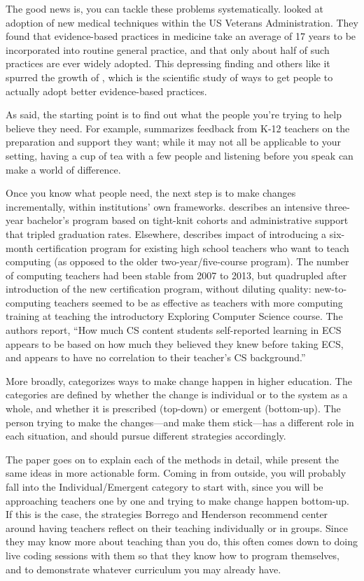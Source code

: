 The good news is, you can tackle these problems systematically.
\cite{Baue2015} looked at adoption of new medical techniques within
the US Veterans Administration.  They found that evidence-based
practices in medicine take an average of 17 years to be incorporated
into routine general practice, and that only about half of such
practices are ever widely adopted.  This depressing finding and others
like it spurred the growth of
, which is
the scientific study of ways to get people to actually adopt better
evidence-based practices.

As  said, the starting point is to find out what
the people you're trying to help believe they need.  For example,
\cite{Yada2016} summarizes feedback from K-12 teachers on the
preparation and support they want; while it may not all be applicable
to your setting, having a cup of tea with a few people and listening
before you speak can make a world of difference.

Once you know what people need, the next step is to make changes
incrementally, within institutions' own frameworks.  \cite{Nara2018}
describes an intensive three-year bachelor's program based on
tight-knit cohorts and administrative support that tripled graduation
rates.  Elsewhere, \cite{Hu2017} describes impact of introducing a
six-month certification program for existing high school teachers who
want to teach computing (as opposed to the older two-year/five-course
program).  The number of computing teachers had been stable from 2007
to 2013, but quadrupled after introduction of the new certification
program, without diluting quality: new-to-computing teachers seemed to
be as effective as teachers with more computing training at teaching
the introductory Exploring Computer Science course.  The authors
report, ``How much CS content students self-reported learning in ECS
appears to be based on how much they believed they knew before taking
ECS, and appears to have no correlation to their teacher's CS
background.''

More broadly, \cite{Borr2014} categorizes ways to make change happen
in higher education.  The categories are defined by whether the change
is individual or to the system as a whole, and whether it is
prescribed (top-down) or emergent (bottom-up). The person trying to
make the changes---and make them stick---has a different role in each
situation, and should pursue different strategies accordingly.

The paper goes on to explain each of the methods in detail, while
\cite{Hend2015a,Hend2015b} present the same ideas in more actionable
form.  Coming in from outside, you will probably fall into the
Individual/Emergent category to start with, since you will be
approaching teachers one by one and trying to make change happen
bottom-up.  If this is the case, the strategies Borrego and Henderson
recommend center around having teachers reflect on their teaching
individually or in groups.  Since they may know more about teaching
than you do, this often comes down to doing live coding sessions with
them so that they know how to program themselves, and to demonstrate
whatever curriculum you may already have.

